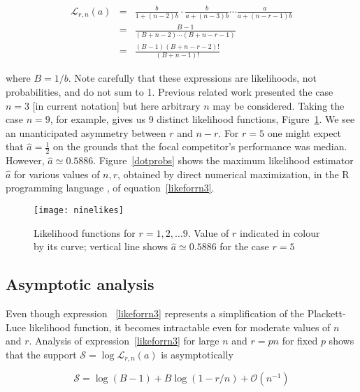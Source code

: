 \documentclass[article]{ajs}
\begin{document}
\begin{eqnarray}\label{likeforrn1}
  \mathcal{L}_{r,n}(a) &=&
\frac{b}{1+ (n-2)b}\cdot
\frac{b}{a+(n-3)b}\cdots\frac{a}{a+(n-r-1)b}\nonumber\\
&=& \frac{B-1}{(B+n-2)\cdots(B+n-r-1)}\nonumber\\ 
&=& \frac{(B-1)(B+n-r-2)!}{(B+n-1)!}\label{likeforrn3}
\end{eqnarray}

\noindent where $B=1/b$.  Note carefully that these expressions are
likelihoods, not probabilities, and do not sum to 1.  Previous related
work \citep{hankin2024_hyper3} presented the case $n=3$ [in current
  notation] but here arbitrary $n$ may be considered.  Taking the case
$n=9$, for example, gives us 9 distinct likelihood functions,
Figure~\ref{ninelikes}.  We see an unanticipated asymmetry between $r$
and $n-r$.  For $r=5$ one might expect that $\hat{a}=\frac{1}{2}$ on
the grounds that the focal competitor's performance was median.
However, $\hat{a}\simeq 0.5886$.  Figure~\ref{dotprobs} shows the
maximum likelihood estimator $\hat{a}$ for various values of $n,r$,
obtained by direct numerical maximization, in the R programming
language \cite{rcore2024}, of equation~\ref{likeforrn3}.

\begin{figure}[t]
  \begin{centering}
\texttt{[image: ninelikes]}  %
\caption{Likelihood functions for $r=1,2,\ldots 9$\label{ninelikes}.  Value
  of $r$ indicated in colour by its curve; vertical line shows
  $\hat{a}\simeq 0.5886$ for the case $r=5$}
\end{centering}
\end{figure}


\subsection{Asymptotic analysis}

Even though expression ~\ref{likeforrn3} represents a simplification
of the Plackett-Luce likelihood function, it becomes intractable even
for moderate values of $n$ and $r$.  Analysis of
expression~\ref{likeforrn3} for large $n$ and $r=pn$ for fixed $p$
shows that the support $\mathcal{S}=\log\mathcal{L}_{r,n}(a)$ is
asymptotically

\begin{equation}\label{asymptotic}
\mathcal{S}=
\log(B-1) + B\log(1-r/n)
+\mathcal{O}\left(n^{-1}\right)
\end{equation}
\end{document}
